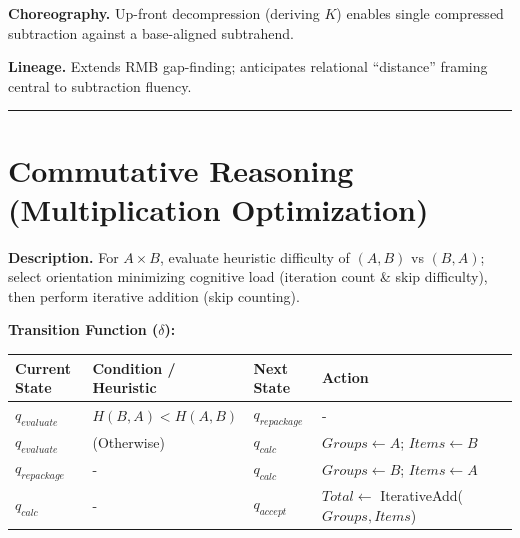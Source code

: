 \documentclass[12pt]{book}
\begin{document}
\textbf{Choreography.} Up-front decompression (deriving \(K\)) enables
single compressed subtraction against a base-aligned subtrahend.

\textbf{Lineage.} Extends RMB gap-finding; anticipates relational
``distance'' framing central to subtraction fluency.

\begin{center}\rule{0.5\linewidth}{0.5pt}\end{center}

\section{Commutative Reasoning (Multiplication
Optimization)}\label{commutative-reasoning-multiplication-optimization}

\textbf{Description.} For \(A \times B\), evaluate heuristic difficulty
of \((A,B)\) vs \((B,A)\); select orientation minimizing cognitive load
(iteration count \& skip difficulty), then perform iterative addition
(skip counting).

\textbf{Transition Function (\(\delta\)):}

\begin{longtable}[]{@{}
  >{\raggedright\arraybackslash}p{}
  >{\raggedright\arraybackslash}p{}
  >{\raggedright\arraybackslash}p{}
  >{\raggedright\arraybackslash}p{}@{}}
\toprule\noalign{}
\begin{minipage}[b]{\linewidth}\raggedright
Current State
\end{minipage} & \begin{minipage}[b]{\linewidth}\raggedright
Condition / Heuristic
\end{minipage} & \begin{minipage}[b]{\linewidth}\raggedright
Next State
\end{minipage} & \begin{minipage}[b]{\linewidth}\raggedright
Action
\end{minipage} \\
\midrule\noalign{}
\endhead
\bottomrule\noalign{}
\endlastfoot
\(q_{evaluate}\) & \(H(B, A) < H(A, B)\) & \(q_{repackage}\) & - \\
\(q_{evaluate}\) & (Otherwise) & \(q_{calc}\) & \(Groups \leftarrow A\);
\(Items \leftarrow B\) \\
\(q_{repackage}\) & - & \(q_{calc}\) & \(Groups \leftarrow B\);
\(Items \leftarrow A\) \\
\(q_{calc}\) & - & \(q_{accept}\) & \(Total \leftarrow\)
IterativeAdd(\(Groups, Items\)) \\
\end{longtable}
\end{document}
